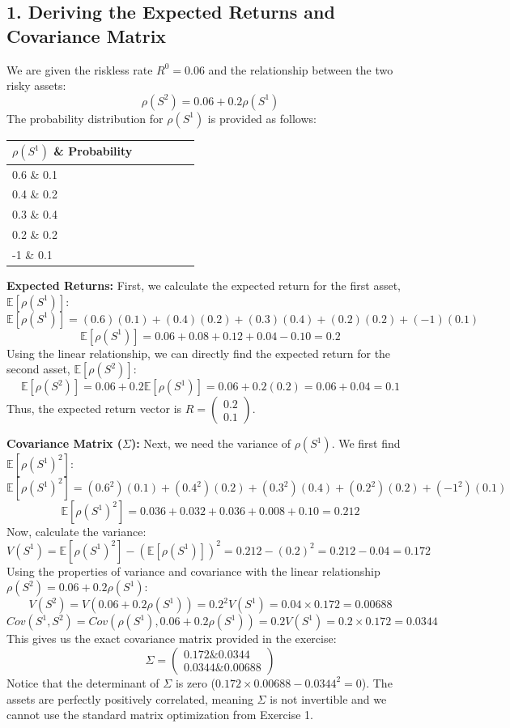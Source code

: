\subsection*{1. Deriving the Expected Returns and Covariance Matrix}
We are given the riskless rate $R^0 = 0.06$ and the relationship between the two risky assets:
\[
\rho(S^2) = 0.06 + 0.2\rho(S^1)
\]
The probability distribution for $\rho(S^1)$ is provided as follows:
\begin{table}[H]
\centering
\begin{tabular}{lccccc}
\toprule
$\rho(S^1)$ \& Probability \\
\midrule
0.6 \& 0.1 \\
0.4 \& 0.2 \\
0.3 \& 0.4 \\
0.2 \& 0.2 \\
-1  \& 0.1 \\
\bottomrule
\end{tabular}
\end{table}

\vspace{0.5em}
\noindent \textbf{Expected Returns:}
First, we calculate the expected return for the first asset, $\mathbb{E}[\rho(S^1)]$:
\[
\mathbb{E}[\rho(S^1)] = (0.6)(0.1) + (0.4)(0.2) + (0.3)(0.4) + (0.2)(0.2) + (-1)(0.1)
\]
\[
\mathbb{E}[\rho(S^1)] = 0.06 + 0.08 + 0.12 + 0.04 - 0.10 = 0.2
\]
Using the linear relationship, we can directly find the expected return for the second asset, $\mathbb{E}[\rho(S^2)]$:
\[
\mathbb{E}[\rho(S^2)] = 0.06 + 0.2\mathbb{E}[\rho(S^1)] = 0.06 + 0.2(0.2) = 0.06 + 0.04 = 0.1
\]
Thus, the expected return vector is $R = \begin{pmatrix} 0.2 \\ 0.1 \end{pmatrix}$.

\vspace{0.5em}
\noindent \textbf{Covariance Matrix ($\Sigma$):}
Next, we need the variance of $\rho(S^1)$. We first find $\mathbb{E}[\rho(S^1)^2]$:
\[
\mathbb{E}[\rho(S^1)^2] = (0.6^2)(0.1) + (0.4^2)(0.2) + (0.3^2)(0.4) + (0.2^2)(0.2) + (-1^2)(0.1)
\]
\[
\mathbb{E}[\rho(S^1)^2] = 0.036 + 0.032 + 0.036 + 0.008 + 0.10 = 0.212
\]
Now, calculate the variance:
\[
V(S^1) = \mathbb{E}[\rho(S^1)^2] - (\mathbb{E}[\rho(S^1)])^2 = 0.212 - (0.2)^2 = 0.212 - 0.04 = 0.172
\]
Using the properties of variance and covariance with the linear relationship $\rho(S^2) = 0.06 + 0.2\rho(S^1)$:
\[
V(S^2) = V(0.06 + 0.2\rho(S^1)) = 0.2^2 V(S^1) = 0.04 \times 0.172 = 0.00688
\]
\[
Cov(S^1, S^2) = Cov(\rho(S^1), 0.06 + 0.2\rho(S^1)) = 0.2 V(S^1) = 0.2 \times 0.172 = 0.0344
\]
This gives us the exact covariance matrix provided in the exercise:
\[
\Sigma = \begin{pmatrix} 0.172 \& 0.0344 \\ 0.0344 \& 0.00688 \end{pmatrix}
\]
Notice that the determinant of $\Sigma$ is zero ($0.172 \times 0.00688 - 0.0344^2 = 0$). The assets are perfectly positively correlated, meaning $\Sigma$ is not invertible and we cannot use the standard matrix optimization from Exercise 1.

